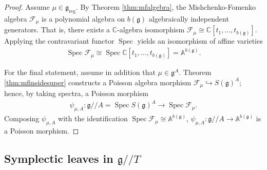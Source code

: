 \documentclass[11pt,reqno]{amsart}
\newtheorem*{theorem A}{Main Theorem A}
\newtheorem*{theorem B}{Main Theorem B}
\newtheorem*{theorem C}{Main Theorem C}
\newtheorem*{theorem D}{Main Theorem D}
\theoremstyle{definition}
\theoremstyle{plain}
\theoremstyle{conclusion}
\begin{document}
\begin{proof}
Assume $\mu\in\mathfrak{g}_{\mathrm{reg}}$. By Theorem \ref{thm:mfalgebra}, the Mishchenko-Fomenko algebra $\mathcal{F}_\mu$ is a polynomial algebra on $b(\mathfrak{g})$ algebraically independent generators. That is, there exists a $\mathbb{C}$-algebra isomorphism $\mathcal{F}_\mu \cong \mathbb{C}[t_1,\dots,t_{b(\mathfrak{g})}]$. Applying the contravariant functor $\operatorname{Spec}$ yields an isomorphism of affine varieties
\begin{align*}
\operatorname{Spec}\mathcal{F}_\mu \cong \operatorname{Spec}\mathbb{C}[t_1,\dots,t_{b(\mathfrak{g})}] = \mathbb{A}^{b(\mathfrak{g})}.
\end{align*}

For the final statement, assume in addition that $\mu\in\mathfrak{g}^A$. Theorem \ref{thm:mfinsidesuper} constructs a Poisson algebra morphism $\mathcal{F}_\mu\hookrightarrow S(\mathfrak{g})^A$; hence, by taking spectra, a Poisson morphism
\begin{align*}
\psi_{\mu,A}:\mathfrak{g}//A=\operatorname{Spec}S(\mathfrak{g})^A \longrightarrow \operatorname{Spec}\mathcal{F}_\mu.
\end{align*}
Composing $\psi_{\mu,A}$ with the identification $\operatorname{Spec}\mathcal{F}_\mu\cong \mathbb{A}^{b(\mathfrak{g})}$, $\psi_{\mu,A}:\mathfrak{g}//A\to\mathbb{A}^{b(\mathfrak{g})}$ is a Poisson morphism.
\end{proof}


\subsection{Symplectic leaves in \texorpdfstring{$\mathfrak{g}//T$}{//T}}
\label{sec:leaves}
 
\end{document}
